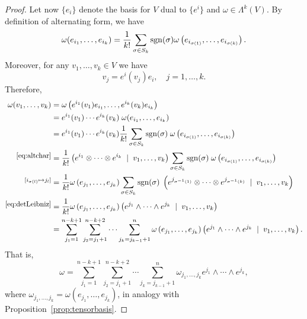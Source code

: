 \begin{proof}
	Let now $\{e_i\}$ denote the basis for $V$ dual to $\{e^i\}$ and $\omega\in\Lambda^k(V)$.
	By definition of alternating form, we have
	\begin{equation}\label{eq:altchar}
		\omega(e_{i_1}, \ldots, e_{i_k}) = \frac1{k!} \sum_{\sigma\in S_k}\operatorname{sgn}(\sigma) \omega\left(e_{i_{\sigma(1)}}, \ldots, e_{i_{\sigma(k)}}\right).
	\end{equation}
	Moreover, for any $v_1,\ldots,v_k\in V$ we have
	\begin{equation}
		v_j = e^i(v_j) e_i, \quad j=1,\ldots, k.
	\end{equation}
	Therefore,
	\begin{align}
		\omega(v_1, \ldots, v_k)
		 & =\omega\left(e^{i_1}(v_1) e_{i_1}, \ldots, e^{i_k}(v_k) e_{i_k}\right)                                                                                                                                  \\
		 & =e^{i_1}(v_1)\cdots e^{i_k}(v_k)\; \omega(e_{i_1}, \ldots, e_{i_k})                                                                                                                                     \\
		 & =e^{i_1}(v_1)\cdots e^{i_k}(v_k) \frac1{k!} \sum_{\sigma\in S_k}\operatorname{sgn}(\sigma)\; \omega\left(e_{i_{\sigma(1)}}, \ldots, e_{i_{\sigma(k)}}\right)                                                         \\
		\overset{\mbox{\small\eqref{eq:altchar}}}{}
		 & = \frac1{k!} \left(e^{i_1}\otimes \cdots \otimes e^{i_k} \;\mid\; v_1, \ldots, v_k\right) \sum_{\sigma\in S_k}\operatorname{sgn}(\sigma)\; \omega\left(e_{i_{\sigma(1)}}, \ldots, e_{i_{\sigma(k)}}\right)            \\
		\overset{[i_{\sigma(l)} \mapsto j_l]}{}
		 & = \frac1{k!} \omega\left(e_{j_1}, \ldots, e_{j_k}\right) \sum_{\sigma\in S_k} \operatorname{sgn}(\sigma) \;\left(e^{j_{\sigma^{-1}(1)}}\otimes \cdots \otimes e^{j_{\sigma^{-1}(k)}} \;\mid\; v_1, \ldots, v_k\right) \\
		\overset{\mbox{\small\eqref{eq:detLeibniz}}}{}
		 & = \frac1{k!} \omega\left(e_{j_1}, \ldots, e_{j_k}\right) \left( e^{j_1}\wedge \cdots \wedge e^{j_k} \;\mid\; v_1, \ldots, v_k\right)                                                                    \\
		 & = \sum_{j_1=1}^{n-k+1}\sum_{j_2=j_1+1}^{n-k+2}\cdots \sum_{j_k=j_{k-1}+1}^{n} \omega\left(e_{j_1}, \ldots, e_{j_k}\right) \left(e^{j_1}\wedge \cdots \wedge e^{j_k} \;\mid\; v_1, \ldots, v_k\right).
	\end{align}
	That is,
	\begin{equation}
		\omega = \sum_{j_1=1}^{n-k+1}\sum_{j_2=j_1+1}^{n-k+2}\cdots \sum_{j_k=j_{k-1}+1}^{n} \omega_{j_1, \ldots, j_k} e^{j_1}\wedge \cdots \wedge e^{j_k},
	\end{equation}
	where $\omega_{j_1, \ldots, j_k} = \omega\left(e_{j_1}, \ldots, e_{j_k}\right)$, in analogy with Proposition~\ref{prop:tensorbasis}.
\end{proof}

